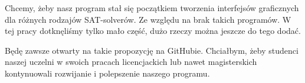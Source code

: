 \documentclass[a4paper,12pt,oneside]{book}
\theoremstyle{definition}
\begin{document}
Chcemy, żeby nasz program stał się początkiem tworzenia interfejsów graficznych dla różnych rodzajów SAT-solverów. Ze względu na brak takich programów. W tej pracy dotknęliśmy tylko mało część, dużo rzeczy można jeszcze do tego dodać.

Będę \cite{einstein} zawsze otwarty na takie propozycję na GitHubie. Chciałbym, żeby \cite{dirac} studenci naszej uczelni w \cite{dirac} swoich pracach licencjackich lub \cite{knuthwebsite} nawet magisterskich \cite{knuth-fa} kontynuowali rozwijanie i polepszenie naszego programu.

\listoffigures{}

\printbibliography[title=Bibliografia]
\end{document}
